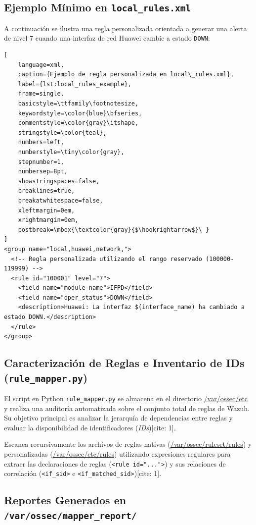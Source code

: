 \subsection{Ejemplo Mínimo en \texttt{local\_rules.xml}}

A continuación se ilustra una regla personalizada orientada a generar una alerta de nivel 7 cuando una interfaz de red Huawei cambie a estado \texttt{DOWN}:

\begin{lstlisting}[
    language=xml,
    caption={Ejemplo de regla personalizada en local\_rules.xml},
    label={lst:local_rules_example},
    frame=single,
    basicstyle=\ttfamily\footnotesize,
    keywordstyle=\color{blue}\bfseries,
    commentstyle=\color{gray}\itshape,
    stringstyle=\color{teal},
    numbers=left,
    numberstyle=\tiny\color{gray},
    stepnumber=1,
    numbersep=8pt,
    showstringspaces=false,
    breaklines=true,
    breakatwhitespace=false,
    xleftmargin=0em,
    xrightmargin=0em,
    postbreak=\mbox{\textcolor{gray}{$\hookrightarrow$}\ }
]
<group name="local,huawei,network,">
  <!-- Regla personalizada utilizando el rango reservado (100000-119999) -->
  <rule id="100001" level="7">
    <field name="module_name">IFPD</field>
    <field name="oper_status">DOWN</field>
    <description>Huawei: La interfaz $(interface_name) ha cambiado a estado DOWN.</description>
  </rule>
</group>
\end{lstlisting}

\subsection{Caracterización de Reglas e Inventario de IDs (\texttt{rule\_mapper.py})}

El script en Python \texttt{rule\_mapper.py} se almacena en el directorio \url{/var/ossec/etc} y realiza una auditoría automatizada sobre el conjunto total de reglas de Wazuh. Su objetivo principal es analizar la jerarquía de dependencias entre reglas y evaluar la disponibilidad de identificadores (\textit{IDs})[cite: 1].

Escanea recursivamente los archivos de reglas nativas (\url{/var/ossec/ruleset/rules}) y personalizadas (\url{/var/ossec/etc/rules}) utilizando expresiones regulares para extraer las declaraciones de reglas (\texttt{<rule id="...">}) y sus relaciones de correlación (\texttt{<if\_sid>} e \texttt{<if\_matched\_sid>})[cite: 1].

\subsection{Reportes Generados en \texttt{/var/ossec/mapper\_report/}}

